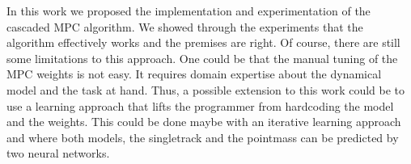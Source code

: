 \documentclass[a4paper, onecolumn, 12pt]{article}
\begin{document}
In this work we proposed the implementation and experimentation of the cascaded
MPC algorithm. We showed through the experiments that the algorithm effectively
works and the premises are right. Of course, there are still some limitations to
this approach. One could be that the manual tuning of the MPC weights is not
easy. It requires domain expertise about the dynamical model and the task at
hand. Thus, a possible extension to this work could be to use a learning
approach that lifts the programmer from hardcoding the model and the weights.
This could be done maybe with an iterative learning approach and where both
models, the singletrack and the pointmass can be predicted by two neural networks.



\end{document}
